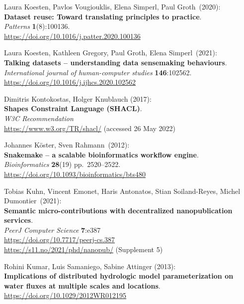 \begin{thebibliography}{9}
Laura Koesten, Pavlos Vougiouklis, Elena Simperl, Paul Groth~(2020):\\
\textbf{Dataset reuse: Toward translating principles to practice}.\\
\emph{Patterns} \textbf{1}(8):100136.\\
\url{https://doi.org/10.1016/j.patter.2020.100136}

Laura Koesten, Kathleen Gregory, Paul Groth, Elena Simperl~(2021):\\
\textbf{Talking datasets -- understanding data sensemaking
behaviours}.\\
\emph{International journal of human-computer studies}
\textbf{146}:102562.\\
\url{https://doi.org/10.1016/j.ijhcs.2020.102562}

Dimitris Kontokostas, Holger Knublauch (2017):\\
\textbf{Shapes {Constraint Language} ({SHACL})}.\\
\emph{W3C Recommendation}\\
\url{https://www.w3.org/TR/shacl/} (accessed 26 May 2022)

Johannes Köster, Sven Rahmann~(2012):\\
\textbf{Snakemake -- a scalable bioinformatics workflow engine}.\\
\emph{Bioinformatics} \textbf{28}(19) pp.~2520--2522.\\
\url{https://doi.org/10.1093/bioinformatics/bts480}

Tobias Kuhn, Vincent Emonet, Haris Antonatos, Stian
Soiland-Reyes, Michel Dumontier~(2021):\\
\textbf{Semantic micro-contributions
with decentralized nanopublication services}.\\
\emph{PeerJ Computer Science} \textbf{7}:e387\\
\url{https://doi.org/10.7717/peerj-cs.387} \\
\url{https://s11.no/2021/phd/nanopub/} (Supplement 5)

Rohini Kumar, Luis Samaniego, Sabine Attinger (2013):\\
\textbf{Implications of distributed hydrologic model parameterization on
water fluxes at multiple scales and locations}.\\
\url{https://doi.org/10.1029/2012WR012195}


\end{thebibliography}
